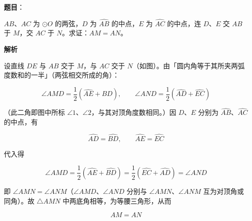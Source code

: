 \begin{answer}

\textbf{题目}：

$AB$、$AC$ 为 $\odot O$ 的两弦，$D$ 为 $\widehat{AB}$ 的中点，$E$ 为 $\widehat{AC}$ 的中点，连 $D$、$E$ 交 $AB$ 于 $M$，交 $AC$ 于 $N$。求证：$AM=AN$。
\nopagebreak[4]
\begin{center}\end{center}
\nopagebreak[4]
\textbf{解析}
\nopagebreak[4]
\begin{center}\end{center}
\nopagebreak[4]
设直线 $DE$ 与 $AB$ 交于 $M$，与 $AC$ 交于 $N$（如图）。由「圆内角等于其所夹两弧度数和的一半」（两弦相交所成的角）：

\nopagebreak[4]
\[
\angle AMD=\frac12\left(\widehat{AE}+\widehat{BD}\right),\qquad
\angle AND=\frac12\left(\widehat{AD}+\widehat{EC}\right)
\]

（此二角即图中所标 $\angle1$、$\angle2$，与其对顶角度数相同。）因 $D$、$E$ 分别为 $\widehat{AB}$、$\widehat{AC}$ 的中点，有

\nopagebreak[4]
\[
\widehat{AD}=\widehat{BD},\qquad \widehat{AE}=\widehat{EC}
\]

代入得

\nopagebreak[4]
\[
\angle AMD=\frac12\left(\widehat{AE}+\widehat{BD}\right)=\frac12\left(\widehat{EC}+\widehat{AD}\right)=\angle AND
\]

即 $\angle AMN=\angle ANM$（$\angle AMD$、$\angle AND$ 分别与 $\angle AMN$、$\angle ANM$ 互为对顶角或同角）。故 $\triangle AMN$ 中两底角相等，为等腰三角形，从而

\nopagebreak[4]
\[
AM=AN
\]


\end{answer}
